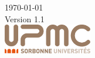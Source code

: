 \begin{titlepage}
\vfill



{\large \today}\\[3mm] %
{\large Version 1.1}\\[1.5cm] 


\includegraphics[height=13mm]{../images/logo.png} %



\end{titlepage}
